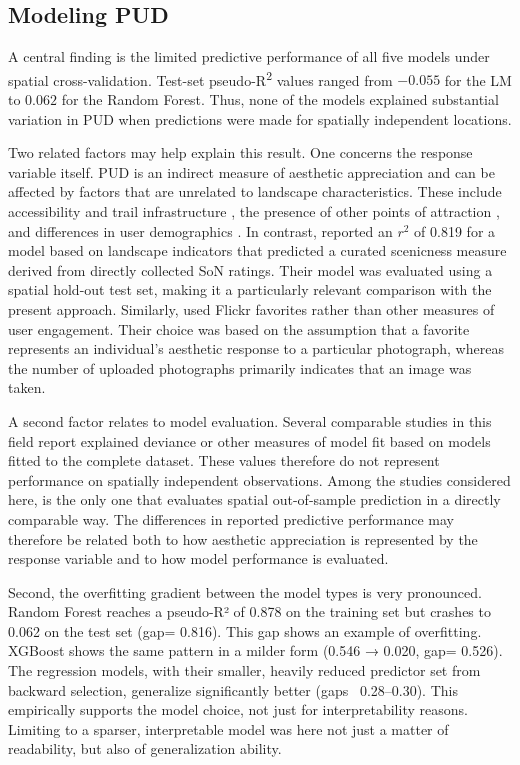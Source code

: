 \documentclass[11pt]{article}
\renewcommand{\_}{\textunderscore\allowbreak{}}
\begin{document}
\subsection{Modeling PUD}
A central finding is the limited predictive performance of all five models under spatial cross-validation. Test-set pseudo-R\textsuperscript{2} values ranged from $-0.055$ for the LM to $0.062$ for the Random Forest. Thus, none of the models explained substantial variation in PUD when predictions were made for spatially independent locations.

Two related factors may help explain this result. One concerns the response variable itself. PUD is an indirect measure of aesthetic appreciation and can be affected by factors that are unrelated to landscape characteristics. These include accessibility and trail infrastructure \citep{langemeyer_mapping_2018}, the presence of other points of attraction \citep{tieskens_aesthetic_2018}, and differences in user demographics \citep{havinga_social_2021, despotovic_beautiful_2025}. In contrast, \citet{havinga_social_2021} reported an $r^2$ of 0.819 for a model based on landscape indicators that predicted a curated scenicness measure derived from directly collected SoN ratings. Their model was evaluated using a spatial hold-out test set, making it a particularly relevant comparison with the present approach. Similarly, \citet{despotovic_beautiful_2025} used Flickr favorites rather than other measures of user engagement. Their choice was based on the assumption that a favorite represents an individual's aesthetic response to a particular photograph, whereas the number of uploaded photographs primarily indicates that an image was taken.

A second factor relates to model evaluation. Several comparable studies in this field \citep{langemeyer_mapping_2018, tieskens_aesthetic_2018, despotovic_beautiful_2025} report explained deviance or other measures of model fit based on models fitted to the complete dataset. These values therefore do not represent performance on spatially independent observations. Among the studies considered here, \citet{havinga_social_2021} is the only one that evaluates spatial out-of-sample prediction in a directly comparable way. The differences in reported predictive performance may therefore be related both to how aesthetic appreciation is represented by the response variable and to how model performance is evaluated.

Second, the overfitting gradient between the model types is very pronounced. Random Forest reaches a pseudo-R² of 0.878 on the training set but crashes to 0.062 on the test set (gap= 0.816). This gap shows an example of overfitting. XGBoost shows the same pattern in a milder form (0.546 → 0.020, gap= 0.526). The regression models, with their smaller, heavily reduced predictor set from backward selection, generalize significantly better (gaps ~0.28–0.30). This empirically supports the model choice, not just for interpretability reasons. Limiting to a sparser, interpretable model was here not just a matter of readability, but also of generalization ability. 
\end{document}
